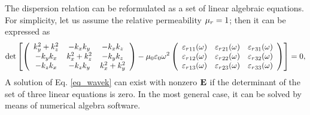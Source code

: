 The dispersion relation can be reformulated \cite[pp. 667]{born1999book} as a set of linear algebraic equations. 
For simplicity, let us assume the relative permeability $\mu_r = 1$; then it can be expressed as 
\begin{equation} \det\left[\left(\begin{array}{ccc} 
	k_y^2+k_z^2  	& -k_x k_y 		& -k_x k_z \\ 
	-k_y k_x 		& k_x^2+k_z^2	& -k_y k_z \\ 
	-k_z k_x 		& -k_z k_y		& k_x^2+k_y^2
	\end{array} \right)
-
	\mu_0 \varepsilon_0 \omega^2
	\left(\begin{array}{ccc} 
	{\varepsilon_r}_{11}(\omega) & {\varepsilon_r}_{21}(\omega) & {\varepsilon_r}_{31}(\omega)  \\
	{\varepsilon_r}_{12}(\omega) & {\varepsilon_r}_{22}(\omega) & {\varepsilon_r}_{32}(\omega)  \\
	{\varepsilon_r}_{13}(\omega) & {\varepsilon_r}_{23}(\omega) & {\varepsilon_r}_{33}(\omega)  
	\end{array} \right) \right] = 0, \label{eq_dispdet}\end{equation}
A solution of Eq. \ref{eq_wavek} can exist with nonzero $\mathbf{E}$ if the determinant of the set of three linear equations is zero.
In the most general case, it can be solved by means of numerical algebra software. 
